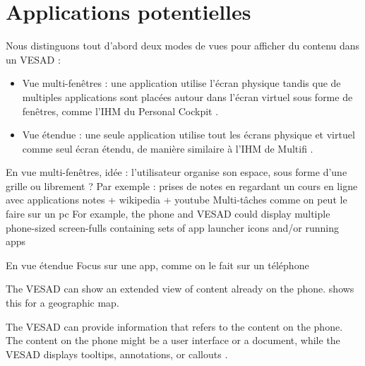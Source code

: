 \section{Applications potentielles}
\label{sec:concept_applications}

Nous distinguons tout d'abord deux modes de vues pour afficher du contenu dans un VESAD :
\begin{itemize}
  \item Vue multi-fenêtres  : une application utilise l'écran physique tandis que de multiples applications sont placées autour dans l'écran virtuel sous forme de fenêtres, comme l'IHM du Personal Cockpit \citep{Ens2014}.
  \item Vue étendue  : une seule application utilise tout les écrans physique et virtuel comme seul écran étendu, de manière similaire à l'IHM de Multifi \citep{Grubert2015}.
\end{itemize}
\bigskip

En vue multi-fenêtres, idée : l'utilisateur organise son espace, sous forme d'une grille ou librement ?
Par exemple : prises de notes en regardant un cours en ligne avec applications notes + wikipedia + youtube
Multi-tâches comme on peut le faire sur un pc
For example, the phone and VESAD could display multiple phone-sized screen-fulls containing sets of app launcher icons and/or running apps 


En vue étendue
Focus sur une app, comme on le fait sur un téléphone

The VESAD can show an extended view of content already on the phone.  shows this for a geographic map.

The VESAD can provide information that refers to the content on the phone. The content on the phone might be a user interface or a document, while the VESAD displays tooltips, annotations, or callouts .


